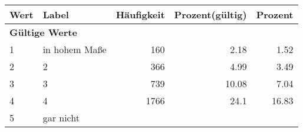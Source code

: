      \begin{longtable}{lXrrr}
     \toprule
     \textbf{Wert} & \textbf{Label} & \textbf{Häufigkeit} & \textbf{Prozent(gültig)} & \textbf{Prozent} \\
     \endhead
     \midrule
     \multicolumn{5}{l}{\textbf{Gültige Werte}}\\

     1 &
     \multicolumn{1}{X}{ in hohem Maße   } &


       \num{160} &
       \num[round-mode=places,round-precision=2]{2.18} &
         \num[round-mode=places,round-precision=2]{1.52} \\

     2 &
     \multicolumn{1}{X}{ 2   } &


       \num{366} &
       \num[round-mode=places,round-precision=2]{4.99} &
         \num[round-mode=places,round-precision=2]{3.49} \\

     3 &
     \multicolumn{1}{X}{ 3   } &


       \num{739} &
       \num[round-mode=places,round-precision=2]{10.08} &
         \num[round-mode=places,round-precision=2]{7.04} \\

     4 &
     \multicolumn{1}{X}{ 4   } &


       \num{1766} &
       \num[round-mode=places,round-precision=2]{24.1} &
         \num[round-mode=places,round-precision=2]{16.83} \\

     5 &
     \multicolumn{1}{X}{ gar nicht   } &



\end{longtable}
